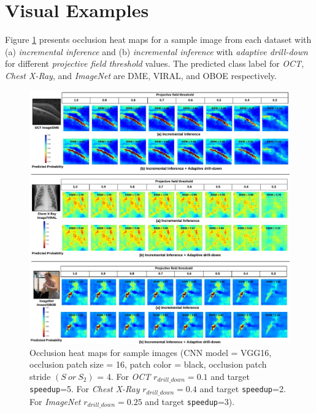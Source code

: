 \section{Visual Examples}

Figure \ref{fig:visual_examples} presents occlusion heat maps for a sample image from each dataset with (a) \textit{incremental inference} and (b) \textit{incremental inference} with \textit{adaptive drill-down} for different \textit{projective field threshold} values. The predicted class label for \textit{OCT}, \textit{Chest X-Ray}, and \textit{ImageNet} are DME, VIRAL, and OBOE respectively.

\begin{figure}[t]
\includegraphics[width=\textwidth]{images/visual_examples}
\caption{Occlusion heat maps for sample images (CNN model = VGG16, occlusion patch size = 16, patch color = black, occlusion patch stride $(S~or~S_2)$ = 4. For \textit{OCT} $r_{drill\_down}=0.1$ and target \texttt{speedup}=5. For \textit{Chest X-Ray} $r_{drill\_down}=0.4$ and target \texttt{speedup}=2. For \textit{ImageNet} $r_{drill\_down}=0.25$ and target \texttt{speedup}=3).}
\label{fig:visual_examples}
\end{figure}